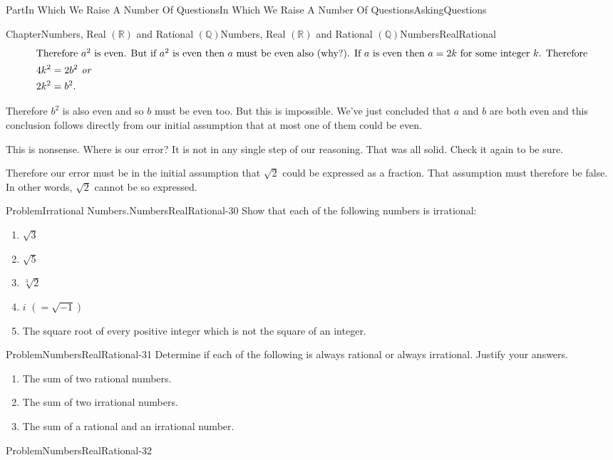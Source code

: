 \documentclass[oneside,10pt,]{book}
\numberwithin{equation}{part}
\newcommand{\RR}{\mathbb {R}}
\newcommand{\QQ}{\mathbb {Q}}
\newcommand{\amp}{&}
\begin{document}
\begin{partptx}{Part}{In Which We Raise A Number Of Questions}{}{In Which We Raise A Number Of Questions}{}{}{AskingQuestions}
\begin{chapterptx}{Chapter}{Numbers, Real \(\left(\RR\right)\) and Rational \(\left(\QQ\right)\)}{}{Numbers, Real \(\left(\RR\right)\) and Rational \(\left(\QQ\right)\)}{}{}{NumbersRealRational}
\begin{align*}
\intertext{Therefore \(a^2\) is even. But if \(a^2\) is even then \(a\) must be even also (why?). If \(a\) is even then \(a=2k\) for some integer \(k\). Therefore}
4k^2\amp =2b^2\textit{ or}\\
2k^2\amp = b^2\text{.}
\end{align*}
%
\par
Therefore \(b^2\) is also even and so \(b\) must be even too. But this is impossible. We've just concluded that \(a\) and \(b\) are both even and this conclusion follows directly from our initial assumption that at most one of them could be even.%
\par
This is nonsense. Where is our error? It is not in any single step of our reasoning. That was all solid. Check it again to be sure.%
\par
Therefore our error must be in the initial assumption that \(\sqrt{2}\) could be expressed as a fraction. That assumption must therefore be false. In other words, \(\sqrt{2}\) cannot be so expressed.%
\begin{problem}{Problem}{Irrational Numbers.}{NumbersRealRational-30}%
Show that each of the following numbers is irrational:%
\begin{enumerate}[font=\bfseries,label=(\alph*),ref=\alph*]%
\item{}\(\sqrt{3}\)%
\item{}\(\sqrt{5}\)%
\item{}\(\sqrt[3]{2}\)%
\item{}\(i\) \((=\sqrt{-1})\)%
\item{}The square root of every positive integer which is not the square of an integer.%
\end{enumerate}%
\end{problem}
\begin{problem}{Problem}{}{NumbersRealRational-31}%
Determine if each of the following is always rational or always irrational. Justify your answers.%
\begin{enumerate}[font=\bfseries,label=(\alph*),ref=\alph*]%
\item{}The sum of two rational numbers.%
\item{}The sum of two irrational numbers.%
\item{}The sum of a rational and an irrational number.%
\end{enumerate}%
\end{problem}
\begin{problem}{Problem}{}{NumbersRealRational-32}%
\begin{enumerate}[font=\bfseries,label=(\alph*),ref=\alph*]%

\end{enumerate}
\end{problem}
\end{chapterptx}
\end{partptx}
\end{document}
